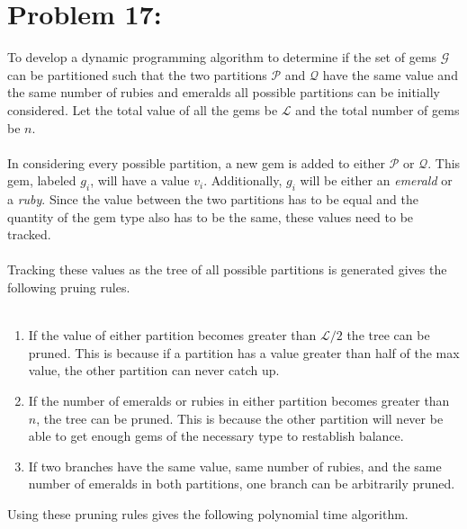 \documentclass[12pt]{article}
\begin{document}
\section*{Problem 17: }
To develop a dynamic programming algorithm to determine if the
set of gems $\mathcal{G}$ can be partitioned such that the two
partitions $\mathcal{P}$ and $\mathcal{Q}$ have the same value
and the same number of rubies and emeralds all possible partitions
can be initially considered.  Let the total value of all the gems
be $\mathcal{L}$ and the total number of gems be $n$.\\\\
In considering every possible partition, a new gem is added to 
either $\mathcal{P}$ or $\mathcal{Q}$.  This gem, labeled
$g_i$, will have a value $v_i$. Additionally, $g_i$ will be 
either an \textit{emerald} or a \textit{ruby}.  Since the value 
between the two partitions has to be equal and the quantity of the
gem type also has to be the same, these values need to be tracked.\\\\
Tracking these values as the tree of all possible partitions is
generated gives the following pruing rules.\\\\
\begin{enumerate}
    \item If the value of either partition becomes greater than $\mathcal{L}/2$
          the tree can be pruned.  This is because if a partition has a value
          greater than half of the max value, the other partition can never
          catch up.
    \item If the number of emeralds or rubies in either partition becomes
          greater than $n$, the tree can be pruned. This is because the other
          partition will never be able to get enough gems of the necessary
          type to restablish balance.
    \item If two branches have the same value, same number of rubies, and
          the same number of emeralds in both partitions, one branch can be
          arbitrarily pruned.
\end{enumerate}
Using these pruning rules gives the following polynomial time algorithm.   
\end{document}
